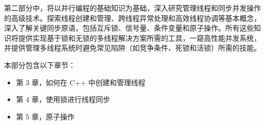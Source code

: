 第二部分中，将以并行编程的基础知识为基础，深入研究管理线程和同步并发操作的高级技术。探索线程创建和管理、跨线程异常处理和高效线程协调等基本概念，深入了解关键同步原语，包括互斥锁、信号量、条件变量和原子操作。所有这些知识将提供实现基于锁和无锁的多线程解决方案所需的工具，一窥高性能并发系统，并提供管理多线程系统时避免常见陷阱（如竞争条件、死锁和活锁）所需的技能。

本部分包含以下章节：

\begin{itemize}
\item
第 3 章，如何在 C++ 中创建和管理线程

\item
第 4 章，使用锁进行线程同步

\item
第 5 章，原子操作
\end{itemize}
